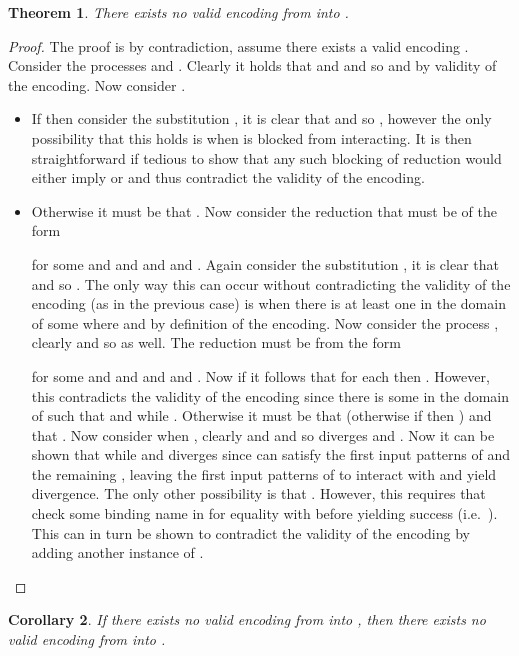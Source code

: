 \documentclass[submission,copyright,creativecommons]{eptcs}
\newtheorem{theorem}{Theorem}[section]
\newtheorem{corollary}[theorem]{Corollary}
\begin{document}
\begin{theorem}
\label{thm:no_name_2_join}
There exists no valid encoding from  into
.
\end{theorem}
\begin{proof}
The proof is by contradiction, assume there exists a valid encoding .
Consider the  processes  and
.
Clearly it holds that  and  and so
 and  by validity of the encoding.
Now consider .
\begin{itemize}
\item If  then consider 
the substitution , it is clear that 
and so , however the only possibility that this holds is
when  is blocked from interacting.
It is then straightforward if tedious to show that any such blocking of reduction would either
imply  or 
and thus contradict the validity of the encoding.


\item Otherwise it must be that . Now consider the reduction 
that must be of the form

for some  and  and  and  and .
Again consider the substitution , it is clear that 
and so . The only way this can occur without contradicting
the validity of the encoding (as in the previous case) is when there is at least one  in the
domain of some  where  and 
by definition of the encoding.
Now consider the process ,
clearly  and so  as well.
The reduction  must be from the form

for some  and  and  and  and .
Now if  it follows that for each  then .
However, this contradicts the validity of the encoding since there is some  in the domain of 
such that  and  while .
Otherwise it must be that  (otherwise if  then )
and that .
Now consider when , 
clearly  and  and so
 diverges and .
Now it can be shown that  while
 and diverges since 
can satisfy the first  input patterns of  and  the remaining
, leaving the first  input patterns of  to interact with 
and yield divergence.
The only other possibility is that .
However, this requires that  check some binding name in  for equality with
 before yielding success (i.e.~). This can in turn be shown
to contradict the validity of the encoding by adding another instance of .
\end{itemize}
\vspace*{-0.6cm}
\end{proof}


\begin{corollary}
If there exists no valid encoding from
 into , then there exists
no valid encoding from  into .
\end{corollary}
\end{document}
